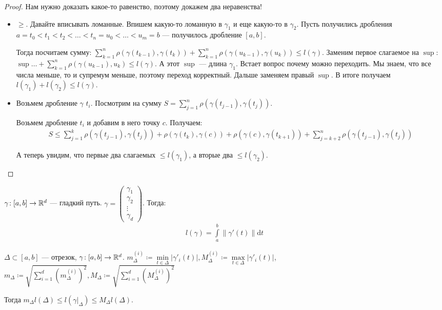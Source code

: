 \begin{proof}
    Нам нужно доказать какое-то равенство, поэтому докажем два неравенства!
    \begin{itemize}
        \item $\ge$. Давайте вписывать ломанные. Впишем какую-то ломанную в $\gamma_1$ и еще какую-то в $\gamma_2$. Пусть получились дробления $a = t_0 < t_1 < t_2 < \ldots < t_n = u_0 < \ldots < u_m = b$ --- получилось дробление $[a, b]$.

            Тогда посчитаем сумму:  $\sum\limits_{k=1}^n \rho(\gamma(t_{k-1}), \gamma(t_k)) + \sum\limits_{k=1}^n \rho(\gamma(u_{k-1}), \gamma(u_k)) \le l(\gamma)$. Заменим первое слагаемое на $\sup$: $\sup \ldots + \sum\limits_{k=1}^n \rho(\gamma(u_{k-1}), u_k) \le l(\gamma)$. А этот $\sup$ --- длина  $\gamma_1$. Встает вопрос почему можно переходить. Мы знаем, что все числа меньше, то и супремум меньше, поэтому переход корректный. Дальше заменяем правый $\sup$. В итоге получаем  $l(\gamma_1) + l(\gamma_2) \le l(\gamma)$.
        \item Возьмем дробление $\gamma$  $t_i$. Посмотрим на сумму  $S = \sum\limits_{j=1}^n\rho(\gamma(t_{j-1}), \gamma(t_j))$. 

            Возьмем дробление $t_i$ и добавим в него точку  $c$. Получаем: 
             \begin{align*}
                S \le \sum_{j=1}^k \rho(\gamma(t_{j-1}), \gamma(t_j)) + \rho(\gamma(t_k), \gamma(c)) + \rho(\gamma(c), \gamma(t_{k+1})) + \sum_{j = k + 2}^n \rho(\gamma(t_{j-1}), \gamma(t_j))
            \end{align*}
            
            А теперь увидим, что первые два слагаемых $\le l(\gamma_1)$, а вторые два $\le l(\gamma_2)$.
    \end{itemize}
\end{proof}
\begin{theorem}
    $\gamma\!: [a,b] \to \mathbb{R}^d$ --- гладкий путь. $\gamma = \begin{pmatrix} \gamma_1 \\ \gamma_2 \\ \vdots \\ \gamma_d \end{pmatrix}$. Тогда: 
\begin{align*}
    l(\gamma) = \int\limits_a^b \| \gamma'(t) \| \mathrm{d}t
\end{align*}
\end{theorem}
\begin{lemma}
    $\Delta \subset [a, b]$ --- отрезок, $\gamma\!: [a, b] \to \mathbb{R}^d$.  $m_\Delta^{(i)} \coloneqq \min\limits_{t \in \Delta}|\gamma'_i(t)|, M_\Delta^{(i)} \coloneqq \max\limits_{t \in \Delta}|\gamma'_i(t)|$, $m_\Delta \coloneqq \sqrt{\sum\limits_{i=1}^d (m_\Delta^{(i)})^2}, M_\Delta \coloneqq \sqrt{\sum\limits_{i=1}^d (M_\Delta^{(i)})^2}$

    Тогда $m_\Delta l(\Delta) \le l(\gamma \Big|_\Delta) \le M_\Delta l(\Delta)$.
\end{lemma}
